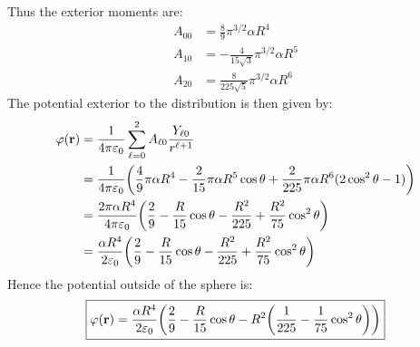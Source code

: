\documentclass[12pt]{article}
\begin{document}
Thus the exterior moments are:
\begin{equation}
  \boxed{
    \begin{aligned}
      A_{00}&=\frac89\pi^{3/2}\alpha R^4\\
      A_{10}&=-\frac{4}{15\sqrt{3}}\pi^{3/2}\alpha R^5\\
      A_{20}&=\frac{8}{225\sqrt{5}}\pi^{3/2}\alpha R^6
    \end{aligned}
  }
\end{equation}
The potential exterior to the distribution is then given by:
\begin{align*}
  \varphi(\vb{r})&=\frac1{4\pi\varepsilon_0}\sum_{\ell=0}^2
  A_{\ell0}\frac{Y_{\ell0}}{r^{\ell+1}}\\
  &=\frac1{4\pi\varepsilon_0}
  \qty(\frac49\pi\alpha R^4
  -\frac2{15}\pi\alpha R^5\cos\theta
  +\frac2{225}\pi\alpha R^6(2\cos^2\theta-1))\\
  &=\frac{2\pi\alpha R^4}{4\pi\varepsilon_0}
  \qty(\frac29-\frac{R}{15}\cos\theta-
  \frac{R^2}{225}+\frac{R^2}{75}\cos^2\theta)\\
  &=\frac{\alpha R^4}{2\varepsilon_0}
  \qty(\frac29-\frac{R}{15}\cos\theta-
  \frac{R^2}{225}+\frac{R^2}{75}\cos^2\theta)
\end{align*}
Hence the potential outside of the sphere is:
\begin{align}
  \boxed{\varphi(\vb{r})=\frac{\alpha R^4}{2\varepsilon_0}
  \qty(\frac29-\frac{R}{15}\cos\theta-
  R^2\qty(\frac1{225}-\frac1{75}\cos^2\theta))}
\end{align}
\end{document}
